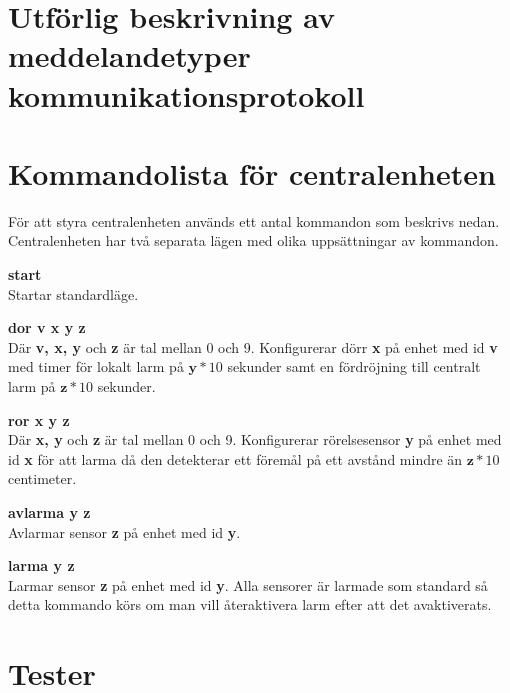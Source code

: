 \documentclass{article}
\begin{document}

\appendix
    \section{Utförlig beskrivning av meddelandetyper kommunikationsprotokoll}
    \label{bilaga:protokoll}
        

    \section{Kommandolista för centralenheten}
    \label{kommandon}
        För att styra centralenheten används ett antal kommandon som beskrivs nedan. Centralenheten har två separata lägen med olika uppsättningar av kommandon.

    \textbf{start}\\
    Startar standardläge.

    \textbf{dor v x y z}\\
    Där \textbf{v, x, y} och \textbf{z} är tal mellan 0 och 9. Konfigurerar dörr \textbf{x} på enhet med id \textbf{v} med timer för lokalt larm på  \(\textbf{y} * 10\) sekunder samt en fördröjning till centralt larm på \(\textbf{z} * 10\) sekunder.

    \textbf{ror x y z}\\
    Där \textbf{x, y} och \textbf{z} är tal mellan 0 och 9. Konfigurerar rörelsesensor \textbf{y} på enhet med id \textbf{x} för att larma då den detekterar ett föremål på ett avstånd mindre än \(\textbf{z} * 10\) centimeter.

    \textbf{avlarma y z} \\
    Avlarmar sensor \textbf{z} på enhet med id \textbf{y}.

    \textbf{larma y z} \\
    Larmar sensor \textbf{z} på enhet med id \textbf{y}. Alla sensorer är larmade som standard så detta kommando körs om man vill återaktivera larm efter att det avaktiverats.

	\clearpage
	\section{Tester}
    		\label{bilaga:tester}
     	
	
	
	
         
         
         
         
         
         
	
\end{document}
